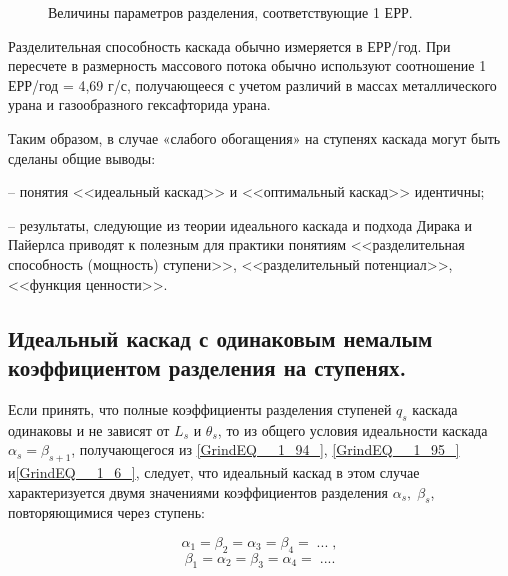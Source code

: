 \begin{figure}[ht]
    \caption{Величины параметров разделения, соответствующие 1 ЕРР.}\label{image5}
  \end{figure}

Разделительная способность каскада обычно измеряется в ЕРР/год. При пересчете в размерность массового потока обычно используют соотношение 1 ЕРР/год = 4,69 г/с, получающееся с учетом различий в массах металлического урана и газообразного гексафторида урана.


Таким образом, в случае «слабого обогащения» на ступенях каскада могут быть сделаны общие выводы:

\noindent -- понятия <<идеальный каскад>> и <<оптимальный каскад>> идентичны;

\noindent -- результаты, следующие из теории идеального каскада и подхода Дирака и Пайерлса приводят к полезным для практики понятиям <<разделительная способность (мощность) ступени>>, <<разделительный потенциал>>, <<функция ценности>>.

\subsection{Идеальный каскад с одинаковым немалым коэффициентом разделения на ступенях.}

Если принять, что полные коэффициенты разделения ступеней $q_{s} $ каскада одинаковы и не зависят от $L_{s} $ и $\theta _{s} $, то из общего условия идеальности каскада $\alpha _{s} =\beta _{s+1} $, получающегося из \ref{GrindEQ__1_94_}, \ref{GrindEQ__1_95_} и\ref{GrindEQ__1_6_}, следует, что идеальный каскад в этом случае характеризуется двумя значениями коэффициентов разделения $\alpha _{s} ,\; \beta _{s} $, повторяющимися через ступень:

\begin{equation} \label{GrindEQ__1_132_} 
\alpha _{1} =\beta _{2} =\alpha _{3} =\beta _{4} =\; ...\; , 
\end{equation} 
\begin{equation} \label{GrindEQ__1_133_} 
\beta _{1} =\alpha _{2} =\beta _{3} =\alpha _{4} =\; .... 
\end{equation} 

